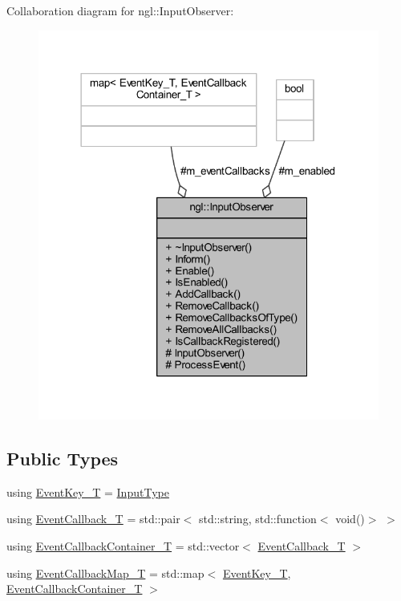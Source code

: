 Collaboration diagram for ngl\+:\+:Input\+Observer\+:
\nopagebreak
\begin{figure}[H]
\begin{center}
\leavevmode
\includegraphics[width=318pt]{classngl_1_1_input_observer__coll__graph}
\end{center}
\end{figure}
\subsection*{Public Types}
\begin{DoxyCompactItemize}
\item 
using \mbox{\hyperlink{classngl_1_1_input_observer_a1bf696a9f5570f16f2b2b19411eeae29}{Event\+Key\+\_\+T}} = \mbox{\hyperlink{namespacengl_a5b20ff50635da5e3adb6bec00c062497}{Input\+Type}}
\item 
using \mbox{\hyperlink{classngl_1_1_input_observer_aa4a14e946d8ea4c4195b5668b1fe1815}{Event\+Callback\+\_\+T}} = std\+::pair$<$ std\+::string, std\+::function$<$ void()$>$ $>$
\item 
using \mbox{\hyperlink{classngl_1_1_input_observer_a42a0cd74782142e52f888e27aacef6f9}{Event\+Callback\+Container\+\_\+T}} = std\+::vector$<$ \mbox{\hyperlink{classngl_1_1_input_observer_aa4a14e946d8ea4c4195b5668b1fe1815}{Event\+Callback\+\_\+T}} $>$
\item 
using \mbox{\hyperlink{classngl_1_1_input_observer_af68ba9cdd29ed56f5f7aa85a36a45258}{Event\+Callback\+Map\+\_\+T}} = std\+::map$<$ \mbox{\hyperlink{namespacengl_a5b20ff50635da5e3adb6bec00c062497}{Event\+Key\+\_\+T}}, \mbox{\hyperlink{classngl_1_1_input_observer_a42a0cd74782142e52f888e27aacef6f9}{Event\+Callback\+Container\+\_\+T}} $>$
\end{DoxyCompactItemize}
